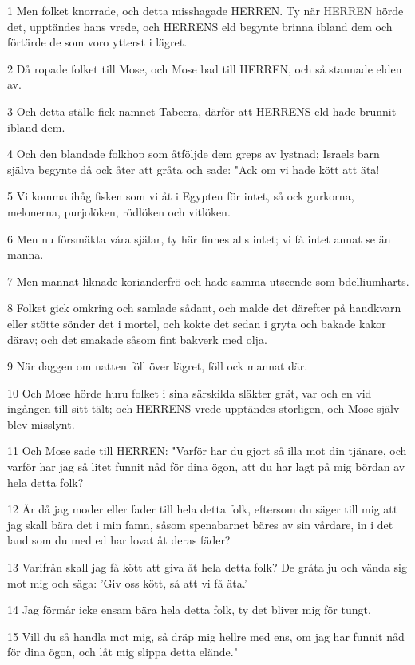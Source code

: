 \par 1 Men folket knorrade, och detta misshagade HERREN. Ty när HERREN hörde det, upptändes hans vrede, och HERRENS eld begynte brinna ibland dem och förtärde de som voro ytterst i lägret.
\par 2 Då ropade folket till Mose, och Mose bad till HERREN, och så stannade elden av.
\par 3 Och detta ställe fick namnet Tabeera, därför att HERRENS eld hade brunnit ibland dem.
\par 4 Och den blandade folkhop som åtföljde dem greps av lystnad; Israels barn själva begynte då ock åter att gråta och sade: "Ack om vi hade kött att äta!
\par 5 Vi komma ihåg fisken som vi åt i Egypten för intet, så ock gurkorna, melonerna, purjolöken, rödlöken och vitlöken.
\par 6 Men nu försmäkta våra själar, ty här finnes alls intet; vi få intet annat se än manna.
\par 7 Men mannat liknade korianderfrö och hade samma utseende som bdelliumharts.
\par 8 Folket gick omkring och samlade sådant, och malde det därefter på handkvarn eller stötte sönder det i mortel, och kokte det sedan i gryta och bakade kakor därav; och det smakade såsom fint bakverk med olja.
\par 9 När daggen om natten föll över lägret, föll ock mannat där.
\par 10 Och Mose hörde huru folket i sina särskilda släkter grät, var och en vid ingången till sitt tält; och HERRENS vrede upptändes storligen, och Mose själv blev misslynt.
\par 11 Och Mose sade till HERREN: "Varför har du gjort så illa mot din tjänare, och varför har jag så litet funnit nåd för dina ögon, att du har lagt på mig bördan av hela detta folk?
\par 12 Är då jag moder eller fader till hela detta folk, eftersom du säger till mig att jag skall bära det i min famn, såsom spenabarnet bäres av sin vårdare, in i det land som du med ed har lovat åt deras fäder?
\par 13 Varifrån skall jag få kött att giva åt hela detta folk? De gråta ju och vända sig mot mig och säga: 'Giv oss kött, så att vi få äta.'
\par 14 Jag förmår icke ensam bära hela detta folk, ty det bliver mig för tungt.
\par 15 Vill du så handla mot mig, så dräp mig hellre med ens, om jag har funnit nåd för dina ögon, och låt mig slippa detta elände."
